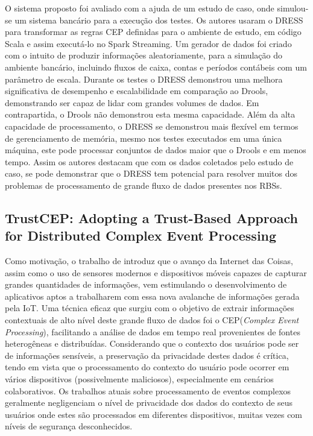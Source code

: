 \documentclass[ti,table]{texufpel} %
\begin{document}
    O sistema proposto foi avaliado com a ajuda de um estudo de caso, onde simulou-se um sistema bancário para a execução dos testes. Os autores usaram o DRESS para transformar as regras CEP definidas para o ambiente de estudo, em código Scala e assim executá-lo no Spark Streaming. Um gerador de dados foi criado com o intuito de produzir informações aleatoriamente, para a simulação do ambiente bancário, incluindo fluxos de caixa, contas e períodos contábeis com um parâmetro de escala. Durante os testes o DRESS demonstrou uma melhora significativa de desempenho e escalabilidade em comparação ao Drools, demonstrando ser capaz de lidar com grandes volumes de dados. Em contrapartida, o Drools não demonstrou esta mesma capacidade. Além da alta capacidade de processamento, o DRESS se demonstrou mais flexível em termos de gerenciamento de memória, mesmo nos testes executados em uma única máquina, este pode processar conjuntos de dados maior que o Drools e em menos tempo. Assim os autores destacam que com os dados coletados pelo estudo de caso, se pode demonstrar que o DRESS tem potencial para resolver muitos dos problemas de processamento de grande fluxo de dados presentes nos RBSs. 

     

  

  

\subsection{TrustCEP: Adopting a Trust-Based Approach for Distributed Complex Event Processing} 

  

    Como motivação, o trabalho de \cite{art6dwarakanath2017trustcep} introduz que o avanço da Internet das Coisas, assim como o uso de sensores modernos e dispositivos móveis capazes de capturar grandes quantidades de informações, vem estimulando o desenvolvimento de aplicativos aptos a trabalharem com essa nova avalanche de informações gerada pela IoT. Uma técnica eficaz que surgiu com o objetivo de extrair informações contextuais de alto nível deste grande fluxo de dados foi o CEP(\textit{Complex Event Processing}), facilitando a análise de dados em tempo real provenientes de fontes heterogêneas e distribuídas. Considerando que o contexto dos usuários pode ser de informações sensíveis, a preservação da privacidade destes dados é crítica, tendo em vista que o processamento do contexto do usuário pode ocorrer em vários dispositivos (possivelmente maliciosos), especialmente em cenários colaborativos. Os trabalhos atuais sobre processamento de eventos complexos geralmente negligenciam o nível de privacidade dos dados do contexto de seus usuários onde estes são processados em diferentes dispositivos, muitas vezes com níveis de segurança desconhecidos.  
\end{document}
